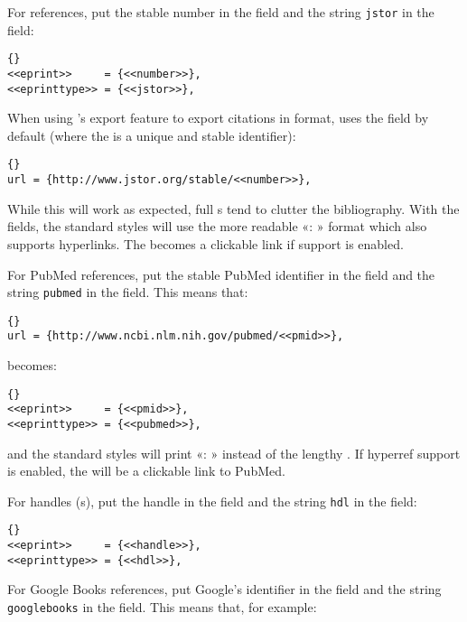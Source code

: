 For  references, put the stable  number in the  field and the string \texttt{jstor} in the  field:

\begin{lstlisting}[style=bibtex]{}
<<eprint>>     = {<<number>>},
<<eprinttype>> = {<<jstor>>},
\end{lstlisting}
%
When using 's export feature to export citations in \bibtex format,  uses the  field by default (where the  is a unique and stable identifier):

\begin{lstlisting}[style=bibtex]{}
url = {http://www.jstor.org/stable/<<number>>},
\end{lstlisting}
%
While this will work as expected, full s tend to clutter the bibliography. With the  fields, the standard styles will use the more readable «: » format which also supports hyperlinks. The  becomes a clickable link if  support is enabled.

For PubMed references, put the stable PubMed identifier in the  field and the string \texttt{pubmed} in the  field. This means that:

\begin{lstlisting}[style=bibtex]{}
url = {http://www.ncbi.nlm.nih.gov/pubmed/<<pmid>>},
\end{lstlisting}
%
becomes:

\begin{lstlisting}[style=bibtex]{}
<<eprint>>     = {<<pmid>>},
<<eprinttype>> = {<<pubmed>>},
\end{lstlisting}
%
and the standard styles will print «: » instead of the lengthy . If hyperref support is enabled, the  will be a clickable link to PubMed.

For handles (s), put the handle in the  field and the string \texttt{hdl} in the  field:

\begin{lstlisting}[style=bibtex]{}
<<eprint>>     = {<<handle>>},
<<eprinttype>> = {<<hdl>>},
\end{lstlisting}
%
For Google Books references, put Google's identifier in the  field and the string \texttt{googlebooks} in the  field. This means that, for example:

